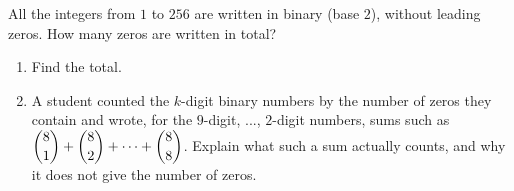 All the integers from $1$ to $256$ are written in binary (base $2$), without leading zeros. How many zeros are written in total?
\begin{enumerate}
\item[(a)] Find the total.
\item[(b)] A student counted the $k$-digit binary numbers by the number of zeros they contain and wrote, for the $9$-digit, ..., $2$-digit numbers, sums such as $\dbinom81+\dbinom82+\cdots+\dbinom88$. Explain what such a sum actually counts, and why it does not give the number of zeros.
\end{enumerate}
